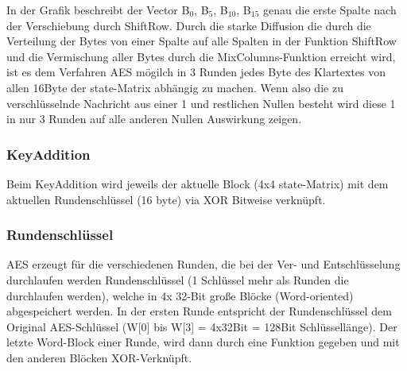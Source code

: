\documentclass[10pt, a4paper,headsepline]{scrreprt}
\begin{document}
In der Grafik beschreibt der Vector B$_{0}$, B$_{5}$, B$_{10}$, B$_{15}$ genau die erste Spalte nach der Verschiebung durch ShiftRow. 
Durch die starke Diffusion die durch die Verteilung der Bytes von einer Spalte auf alle Spalten in der Funktion ShiftRow und die Vermischung aller Bytes durch die MixColumns-Funktion erreicht wird, ist es dem Verfahren AES mögilch in 3 Runden jedes Byte des Klartextes von allen 16Byte der state-Matrix abhängig zu machen. Wenn also die zu verschlüsselnde Nachricht aus einer 1 und restlichen Nullen besteht wird diese 1 in nur 3 Runden auf alle anderen Nullen Auswirkung zeigen.


\subsubsection{KeyAddition}
Beim KeyAddition wird jeweils der aktuelle Block (4x4 state-Matrix) mit dem aktuellen Rundenschlüssel (16 byte) via XOR Bitweise verknüpft. 

\subsubsection{Rundenschlüssel}
AES erzeugt für die verschiedenen Runden, die bei der Ver- und Entschlüsselung durchlaufen werden Rundenschlüssel (1 Schlüssel mehr als Runden die durchlaufen werden), welche in 4x 32-Bit große Blöcke (Word-oriented) abgespeichert werden. In der ersten Runde entspricht der Rundenschlüssel dem Original AES-Schlüssel (W[0] bis W[3] = 4x32Bit = 128Bit Schlüssellänge). Der letzte Word-Block einer Runde, wird dann durch eine Funktion gegeben und mit den anderen Blöcken XOR-Verknüpft. 
\end{document}
